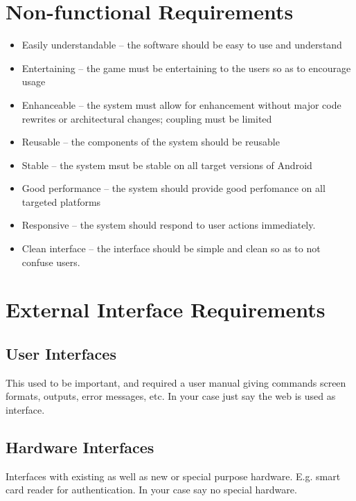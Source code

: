 \documentclass[a4wide]{article}
\begin{document}
\section{Non-functional Requirements}
\begin{itemize}
\item Easily understandable -- the software should be easy to use and understand
\item Entertaining -- the game must be entertaining to the users so as to
encourage usage
\item Enhanceable -- the system must allow for enhancement without major code
rewrites or architectural changes; coupling must be limited
\item Reusable -- the components of the system should be reusable
\item Stable -- the system msut be stable on all target versions of Android
\item Good performance -- the system should provide good perfomance on all
targeted platforms
\item Responsive -- the system should respond to user actions immediately.
\item Clean interface -- the interface should be simple and clean so as to not
confuse users.
\end{itemize}


\section{External Interface Requirements}

\subsection{User Interfaces}

This used to be important, and required a user manual giving commands
screen formats, outputs, error messages, etc.
In your case just say the web is used as interface.

\subsection{Hardware Interfaces}

Interfaces with existing as well as new or special purpose hardware.
E.g. smart card reader for authentication.
In your case say no special hardware.
\end{document}
